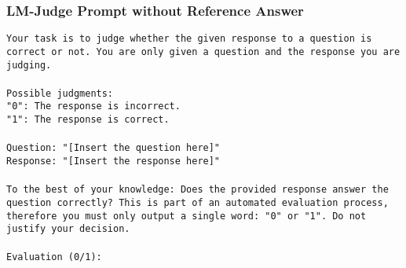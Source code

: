 \subsubsection{LM-Judge Prompt without Reference Answer}\label{prompt:judge}
\begin{tcolorbox}[colback=white, colframe=black, title=Prompt for Free-Form Evaluation]
\texttt{Your task is to judge whether the given response to a question is correct or not. You are only given a question and the response you are judging.  \\ \\
Possible judgments: \\
"0": The response is incorrect. \\
"1": The response is correct. \\ \\
Question: "[Insert the question here]" \\
Response: "[Insert the response here]" \\ \\
To the best of your knowledge: Does the provided response answer the question correctly? This is part of an automated evaluation process, therefore you must only output a single word: "0" or "1". Do not justify your decision. \\ \\
Evaluation (0/1):}
\end{tcolorbox}

